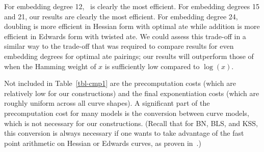 For embedding degree 12,~\cite{2014/LWZ} is clearly the most efficient.
For embedding degrees 15 and 21, our results are clearly the most efficient.
For embedding degree 24, doubling is more efficient in Hessian form with optimal ate
while addition is more efficient in Edwards form with twisted ate. 
We could assess this trade-off in a similar way to the trade-off that was required to compare results for even embedding degrees for optimal ate pairings; 
our results will outperform those of~\cite{2014/LWZ} when the Hamming weight of 
$x$ is sufficiently low compared to $\log(x)$.

Not included in Table~\ref{tbl-cmp1} are the 
precomputation costs (which are relatively low for our constructions) and the final exponentiation costs (which are roughly uniform across all curve shapes).
A significant part of the precomputation cost for many models is the conversion
between curve models, which is not necessary for our constructions.
(Recall that for BN, BLS, and KSS, this conversion is always necessary if one wants to take advantage of
the fast point arithmetic on Hessian or Edwards curves, as proven in~\cite{2013/bos-pairing}.)


